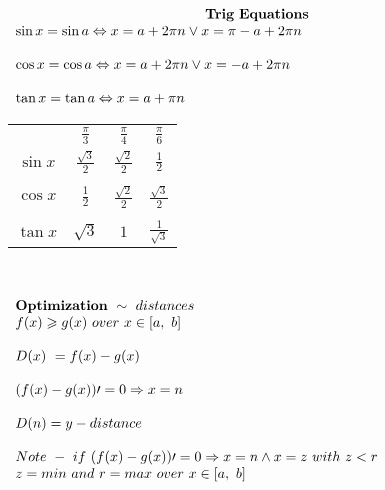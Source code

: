 \documentclass{article}
\begin{document}
\setlength{\columnsep}{0.7cm}
\begin{multicols}{2}
    \noindent 
    \begin{center}
    $\displaystyle  \begin{array}{{>{\displaystyle}l}}
    \centerline{$\mathbf{Trig\ Equations}$}\\
    \sin x=\sin a\Leftrightarrow x=a+2\pi n\lor x=\pi -a+2\pi n\\
    \\
    \cos x=\cos a\Leftrightarrow x=a+2\pi n\lor x=-a+2\pi n\\
    \\
    \tan x=\tan a\Leftrightarrow x=a+\pi n
    \end{array}$
    \begin{tabular}{cccc}
    \\
    \\
    \toprule 
    & $\displaystyle \frac{\pi }{3}$ & $\displaystyle \frac{\pi }{4}$ & $\displaystyle \frac{\pi }{6}$ \\
    \midrule 
    $\displaystyle \sin x$ & $\displaystyle \frac{\sqrt{3}}{2}$ & $\displaystyle \frac{\sqrt{2}}{2}$ & $\displaystyle \frac{1}{2}$ \\
    \\
    $\displaystyle \cos x$ & $\displaystyle \frac{1}{2}$ & $\displaystyle \frac{\sqrt{2}}{2}$ & $\displaystyle \frac{\sqrt{3}}{2}$ \\
    \\
    $\displaystyle \tan x$ & $\displaystyle \sqrt{3}$ & $\displaystyle 1$ & $\displaystyle \frac{1}{\sqrt{3}}$ \\
    \bottomrule
    \end{tabular}
    $\displaystyle \begin{array}{>{\displaystyle}l}
        \\
        \\
    \mathbf{Optimization\ } \sim \ distances\\
    f( x) \geqslant g( x) \ over\ x\in [ a,\ b]\\
    \\
    D( x) \ =f( x) -g( x)\\
    \\
    ( f( x) -g( x)) \prime =0\Rightarrow x=n\\
    \\
    D( n) =y -  distance\\
    \\
    Note\ -\ if\ ( f( x) -g( x)) \prime =0\Rightarrow x=n\land x=z\ with\ z< r\\
    z=min\ and\ r=max\ over\ x\in [ a,\ b]
    \end{array}$
    \end{center}


\end{multicols}
\end{document}
